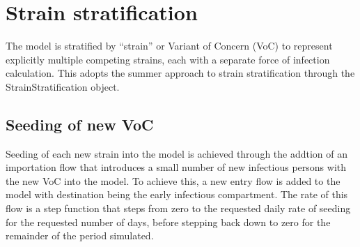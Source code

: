 \section{Strain stratification} \label{strain}
The model is stratified by ``strain'' or Variant of Concern (VoC)
to represent explicitly multiple competing strains, each with a separate force of infection calculation.
This adopts the summer approach to strain stratification through the StrainStratification object.

\subsection{Seeding of new VoC}
Seeding of each new strain into the model is achieved through the addtion of an importation flow
that introduces a small number of new infectious persons with the new VoC into the model.
To achieve this, a new entry flow is added to the model with destination being the early infectious compartment.
The rate of this flow is a step function that steps from zero to the requested daily rate of seeding for the requested number of days,
before stepping back down to zero for the remainder of the period simulated.